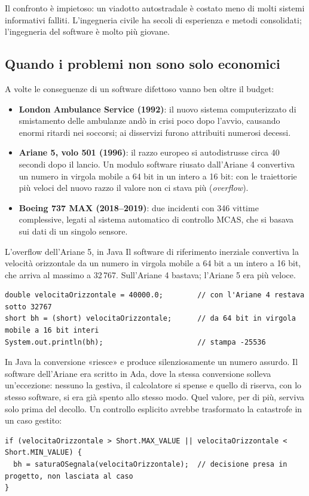 Il confronto è impietoso: un viadotto autostradale è costato meno di molti sistemi informativi falliti.
L'ingegneria civile ha secoli di esperienza e metodi consolidati; l'ingegneria del software è molto più giovane.

\subsection{Quando i problemi non sono solo economici}

A volte le conseguenze di un software difettoso vanno ben oltre il budget:

\begin{itemize}
  \item \textbf{London Ambulance Service (1992)}: il nuovo sistema computerizzato di smistamento delle ambulanze andò in crisi poco dopo l'avvio,
        causando enormi ritardi nei soccorsi; ai disservizi furono attribuiti numerosi decessi.
  \item \textbf{Ariane 5, volo 501 (1996)}: il razzo europeo si autodistrusse circa 40 secondi dopo il lancio. Un modulo software riusato
        dall'Ariane 4 convertiva un numero in virgola mobile a 64 bit in un intero a 16 bit: con le traiettorie più veloci del nuovo razzo
        il valore non ci stava più (\textit{overflow}).
  \item \textbf{Boeing 737 MAX (2018--2019)}: due incidenti con 346 vittime complessive, legati al sistema automatico di controllo MCAS,
        che si basava sui dati di un singolo sensore.
\end{itemize}

\begin{esempio}{L'overflow dell'Ariane 5, in Java}
Il software di riferimento inerziale convertiva la velocità orizzontale da un numero in virgola mobile a 64 bit a un
intero a 16 bit, che arriva al massimo a 32\,767. Sull'Ariane 4 bastava; l'Ariane 5 era più veloce.
\begin{lstlisting}[style=java, name=Conversione.java]
double velocitaOrizzontale = 40000.0;        // con l'Ariane 4 restava sotto 32767
short bh = (short) velocitaOrizzontale;      // da 64 bit in virgola mobile a 16 bit interi
System.out.println(bh);                      // stampa -25536
\end{lstlisting}
In Java la conversione «riesce» e produce silenziosamente un numero assurdo. Il software dell'Ariane era scritto in Ada,
dove la stessa conversione solleva un'eccezione: nessuno la gestiva, il calcolatore si spense e quello di riserva, con lo
stesso software, si era già spento allo stesso modo. Quel valore, per di più, serviva solo prima del decollo. Un controllo
esplicito avrebbe trasformato la catastrofe in un caso gestito:
\begin{lstlisting}[style=java, name=Conversione.java]
if (velocitaOrizzontale > Short.MAX_VALUE || velocitaOrizzontale < Short.MIN_VALUE) {
  bh = saturaOSegnala(velocitaOrizzontale);  // decisione presa in progetto, non lasciata al caso
}
\end{lstlisting}
\end{esempio}

